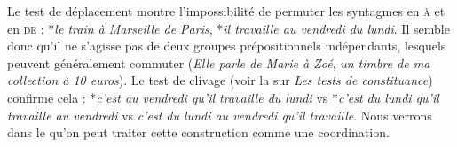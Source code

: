 {  Le test de déplacement montre l’impossibilité de permuter les syntagmes en \textsc{à} et en \textsc{de} : *\textit{le train à Marseille de Paris}, *\textit{il travaille au vendredi du lundi}. Il semble donc qu’il ne s’agisse pas de deux groupes prépositionnels indépendants, lesquels peuvent généralement commuter (\textit{Elle parle de Marie à Zoé}, \textit{un timbre de ma collection à 10 euros}). Le test de clivage (voir la  sur \textit{Les tests de constituance}) confirme cela : *\textit{c’est au vendredi qu’il travaille du lundi} vs *\textit{c’est du lundi qu’il travaille au vendredi} vs \textit{c’est du lundi au vendredi qu’il travaille}. Nous verrons dans le  qu’on peut traiter cette construction comme une coordination.
}
